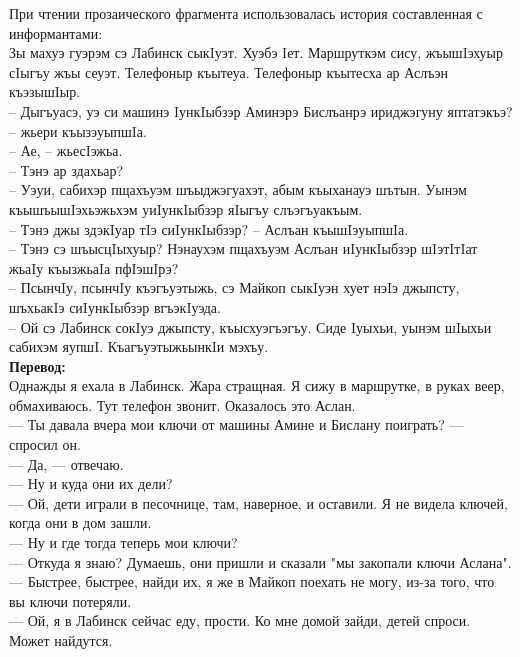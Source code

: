 \noindent При чтении прозаического фрагмента использовалась история составленная с информантами: \medskip\\
\noindent Зы махуэ гуэрэм сэ Лабинск сыкIуэт. Хуэбэ Iет. Маршруткэм сису, жъышIэхуыр сIыгъу жъы сеуэт. Телефоныр къытеуа. Телефоныр къытесха ар Аслъэн къэзышIыр.\\
– Дыгъуасэ, уэ си машинэ IункIыбзэр Аминэрэ Бислъанрэ ириджэгуну яптатэкъэ? – жьери къызэуыпшIа.\\
– Ае, – жьесIэжьа.\\
– Тэнэ ар здахьар?\\
– Уэуи, сабихэр пщахъуэм шъыджэгуахэт, абым къыханауэ шътын. Уынэм къышъышIэхьэжьхэм уиIункIыбзэр яIыгъу слъэгъуакъым.\\
– Тэнэ джы здэкIуар тIэ сиIункIыбзэр? – Аслъан  къышIэуыпшIа.\\
– Тэнэ сэ шъысцIыхуыр? Нэнаухэм пщахъуэм Аслъан иIункIыбзэр шIэтIтIат жьаIу къызжьаIа пфIэшIрэ?\\
– ПсынчIу, псынчIу къэгъуэтыжь, сэ Майкоп сыкIуэн хует нэIэ джыпсту, шъхьакIэ сиIункIыбзэр вгъэкIуэда.\\
– Ой сэ Лабинск сокIуэ джыпсту, къысхуэгъэгъу. Сиде Iуыхьи, уынэм шIыхьи сабихэм яупшI. КъагъуэтыжьынкIи мэхъу.\bigskip\\

\textbf{Перевод:}\\
Однажды я ехала в Лабинск. Жара стращная. Я сижу в маршрутке, в руках веер, обмахиваюсь. Тут телефон звонит. Оказалось это Аслан.\\
--- Ты давала вчера мои ключи от машины Амине и Бислану поиграть? --- спросил он.\\
--- Да, --- отвечаю.\\
--- Ну и куда они их дели?\\
--- Ой, дети играли в песочнице, там, наверное, и оставили. Я не видела ключей, когда они в дом зашли.\\
--- Ну и где тогда теперь мои ключи?\\
--- Откуда я знаю? Думаешь, они пришли и сказали "мы закопали ключи Аслана".
--- Быстрее, быстрее, найди их, я же в Майкоп поехать не могу, из-за того, что вы ключи потеряли.\\
--- Ой, я в Лабинск сейчас еду, прости. Ко мне домой зайди, детей спроси. Может найдутся.
\pagebreak